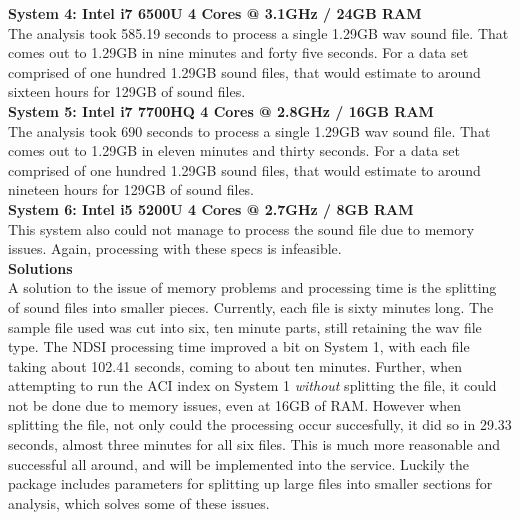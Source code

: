 \noindent\textbf{System 4: Intel i7 6500U 4 Cores @ 3.1GHz / 24GB RAM}\\
The analysis took 585.19 seconds to process a single 1.29GB wav sound file. That comes out to 1.29GB in nine minutes and forty five seconds. For a data set comprised of one hundred 1.29GB sound files, that would estimate to around sixteen hours for 129GB of sound files.\\

\noindent\textbf{System 5: Intel i7 7700HQ 4 Cores @ 2.8GHz / 16GB RAM}\\
The analysis took 690 seconds to process a single 1.29GB wav sound file. That comes out to 1.29GB in eleven minutes and thirty seconds. For a data set comprised of one hundred 1.29GB sound files, that would estimate to around nineteen hours for 129GB of sound files.\\

\noindent\textbf{System 6: Intel i5 5200U 4 Cores @ 2.7GHz / 8GB RAM}\\
This system also could not manage to process the sound file due to memory issues. Again, processing with these specs is infeasible.\\

\noindent\textbf{Solutions}\\
A solution to the issue of memory problems and processing time is the splitting of sound files into smaller pieces. Currently, each file is sixty minutes long. The sample file used was cut into six, ten minute parts, still retaining the wav file type. The NDSI processing time improved a bit on System 1, with each file taking  about 102.41 seconds, coming to about ten minutes. Further, when attempting to run the ACI index on System 1 \textit{without} splitting the file, it could not be done due to memory issues, even at 16GB of RAM. However when splitting the file, not only could the processing occur succesfully, it did so in 29.33 seconds, almost three minutes for all six files. This is much more reasonable and successful all around, and will be implemented into the service. Luckily the  package includes parameters for splitting up large files into smaller sections for analysis, which solves some of these issues.\\

